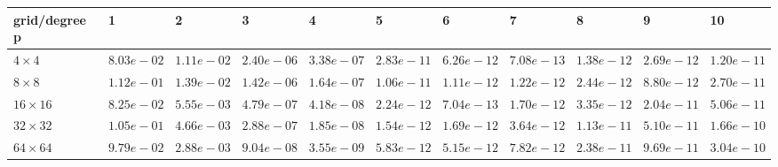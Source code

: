 \begin{tabular}{lllllllllll}
\hline
 grid/degree p   & 1          & 2          & 3          & 4          & 5          & 6          & 7          & 8          & 9          & 10         \\
\hline
 $4 \times 4$    & $8.03e-02$ & $1.11e-02$ & $2.40e-06$ & $3.38e-07$ & $2.83e-11$ & $6.26e-12$ & $7.08e-13$ & $1.38e-12$ & $2.69e-12$ & $1.20e-11$ \\
 $8 \times 8$    & $1.12e-01$ & $1.39e-02$ & $1.42e-06$ & $1.64e-07$ & $1.06e-11$ & $1.11e-12$ & $1.22e-12$ & $2.44e-12$ & $8.80e-12$ & $2.70e-11$ \\
 $16 \times 16$  & $8.25e-02$ & $5.55e-03$ & $4.79e-07$ & $4.18e-08$ & $2.24e-12$ & $7.04e-13$ & $1.70e-12$ & $3.35e-12$ & $2.04e-11$ & $5.06e-11$ \\
 $32 \times 32$  & $1.05e-01$ & $4.66e-03$ & $2.88e-07$ & $1.85e-08$ & $1.54e-12$ & $1.69e-12$ & $3.64e-12$ & $1.13e-11$ & $5.10e-11$ & $1.66e-10$ \\
 $64 \times 64$  & $9.79e-02$ & $2.88e-03$ & $9.04e-08$ & $3.55e-09$ & $5.83e-12$ & $5.15e-12$ & $7.82e-12$ & $2.38e-11$ & $9.69e-11$ & $3.04e-10$ \\
\hline
\end{tabular}